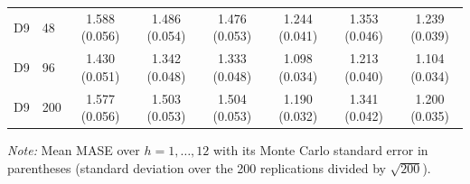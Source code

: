 \begin{table}[!htbp]
\begin{threeparttable}
\begin{tabular}{llcccccc}
D9 & 48 & 1.588 (0.056) & 1.486 (0.054) & 1.476 (0.053) & 1.244 (0.041) & 1.353 (0.046) & 1.239 (0.039) \\
D9 & 96 & 1.430 (0.051) & 1.342 (0.048) & 1.333 (0.048) & 1.098 (0.034) & 1.213 (0.040) & 1.104 (0.034) \\
D9 & 200 & 1.577 (0.056) & 1.503 (0.053) & 1.504 (0.053) & 1.190 (0.032) & 1.341 (0.042) & 1.200 (0.035) \\
\bottomrule
\end{tabular}
\begin{tablenotes}[flushleft]\footnotesize
\item \textit{Note:} Mean MASE over $h = 1, \dots, 12$ with its Monte Carlo standard error in parentheses (standard deviation over the 200 replications divided by $\sqrt{200}$).
\end{tablenotes}
\end{threeparttable}
\end{table}
